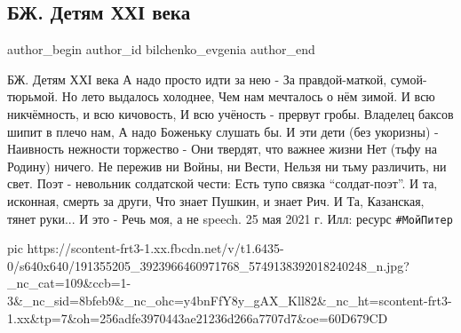  
 
 
 
 
 
\subsection{БЖ. Детям ХХІ века}
\label{sec:25_05_2021.fb.bilchenko_evgenia.3.detjam_xxi_vek}
\ifcmt
 author_begin
   author_id bilchenko_evgenia
 author_end
\fi

БЖ. Детям ХХІ века
А надо просто идти за нею - 
За правдой-маткой, сумой-тюрьмой.
Но лето выдалось холоднее,
Чем нам мечталось о нём зимой.
И всю никчёмность, и всю кичовость,
И всю учёность - прервут гробы.
Владелец баксов шипит в плечо нам,
А надо Боженьку слушать бы.
И эти дети (без укоризны) -
Наивность нежности торжество -
Они твердят, что важнее жизни
Нет (тьфу на Родину) ничего.
Не пережив ни Войны, ни Вести,
Нельзя ни тьму различить, ни свет.
Поэт - невольник солдатской чести:
Есть тупо связка \enquote{солдат-поэт}.
И та, исконная, смерть за други,
Что знает Пушкин, и знает Рич.
И Та, Казанская, тянет руки...
И это - Речь моя, а не speech.
25 мая 2021  г.
Илл: ресурс \verb|#МойПитер|


\ifcmt
  pic https://scontent-frt3-1.xx.fbcdn.net/v/t1.6435-0/s640x640/191355205_3923966460971768_5749138392018240248_n.jpg?_nc_cat=109&ccb=1-3&_nc_sid=8bfeb9&_nc_ohc=y4bnFfY8y_gAX_Kll82&_nc_ht=scontent-frt3-1.xx&tp=7&oh=256adfe3970443ae21236d266a7707d7&oe=60D679CD
\fi

